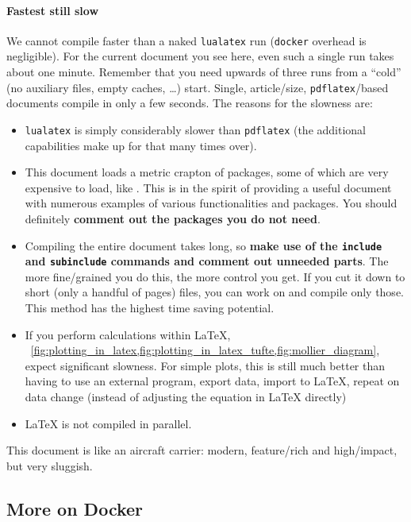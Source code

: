 \paragraph{Fastest still slow}
We cannot compile faster than a naked \texttt{lualatex} run (\texttt{docker} overhead is negligible).
For the current document you see here, even such a single run takes about one minute.
Remember that you need upwards of three runs from a \enquote{cold} (no auxiliary files, empty caches, \dots{}) start.
Single, article\-/size, \texttt{pdflatex}\-/based documents compile in only a few seconds.
The reasons for the slowness are:
\begin{itemize}
    \item \texttt{lualatex} is simply considerably slower than \texttt{pdflatex}
        (the additional capabilities make up for that many times over).
    \item This document loads a metric crapton of packages, some of which are very expensive to load, like .
        This is in the spirit of providing a useful document with numerous examples of various functionalities and packages.
        You should definitely \textbf{\textcolor{mRed}{comment out the packages you do not need}}.
    \item Compiling the entire document takes long, so \textbf{\textcolor{mRed}{make use of the \texttt{include} and \texttt{subinclude}} commands and comment out unneeded parts}.
        The more fine\-/grained you do this, the more control you get.
        If you cut it down to short (only a handful of  pages) files, you can work on and compile only those.
        This method has the highest time saving potential.
    \item If you perform  calculations within \LaTeX{}, \ \cref{fig:plotting_in_latex,fig:plotting_in_latex_tufte,fig:mollier_diagram}, expect significant slowness.
        For simple plots, this is still much better than having to use an external program, export data, import to \LaTeX{}, repeat on data change (instead of adjusting the equation in \LaTeX{} directly) 
    \item \LaTeX{} is not compiled in parallel.
\end{itemize}
This document is like an aircraft carrier: modern, feature\-/rich and high\-/impact, but very sluggish.

\subsection{More on Docker}

